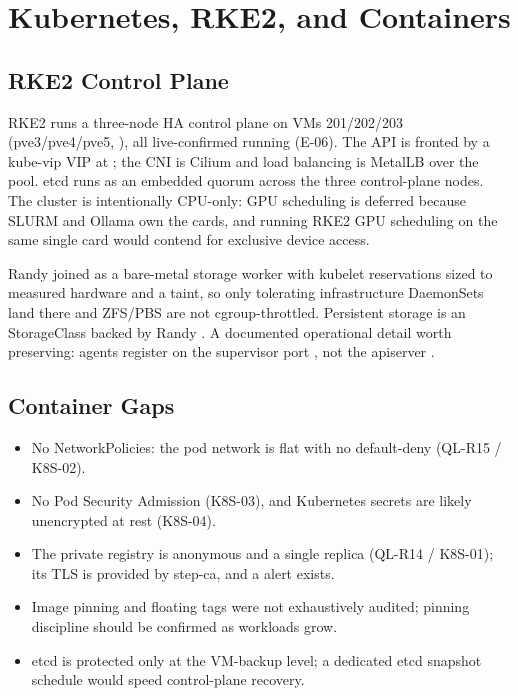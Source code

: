 \section{Kubernetes, RKE2, and Containers}\label{sec:k8s}

\subsection{RKE2 Control Plane}

RKE2 runs a three-node HA control plane on VMs 201/202/203 (pve3/pve4/pve5,
), all live-confirmed running (E-06). The API is fronted by a kube-vip VIP
at ; the CNI is Cilium and load balancing is MetalLB over the
 pool. etcd runs as an embedded quorum across the three control-plane
nodes. The cluster is intentionally CPU-only: GPU scheduling is deferred because SLURM
and Ollama own the cards, and running RKE2 GPU scheduling on the same single card would
contend for exclusive device access.

Randy joined as a bare-metal storage worker with kubelet reservations sized to measured
hardware and a  taint, so only tolerating
infrastructure DaemonSets land there and ZFS/PBS are not cgroup-throttled. Persistent
storage is an  StorageClass backed by Randy . A
documented operational detail worth preserving: agents register on the supervisor port
, not the apiserver .

\subsection{Container Gaps}

\begin{itemize}
\item \sevmed No NetworkPolicies: the pod network is flat with no default-deny
(QL-R15 / K8S-02).
\item \sevmed No Pod Security Admission (K8S-03), and Kubernetes secrets are likely
unencrypted at rest (K8S-04).
\item \sevmed The private registry is anonymous and a single replica (QL-R14 / K8S-01);
its TLS is provided by step-ca, and a  alert exists.
\item \sevlow Image pinning and floating  tags were not exhaustively
audited; pinning discipline should be confirmed as workloads grow.
\item \sevinfo etcd is protected only at the VM-backup level; a dedicated etcd snapshot
schedule would speed control-plane recovery.
\end{itemize}

